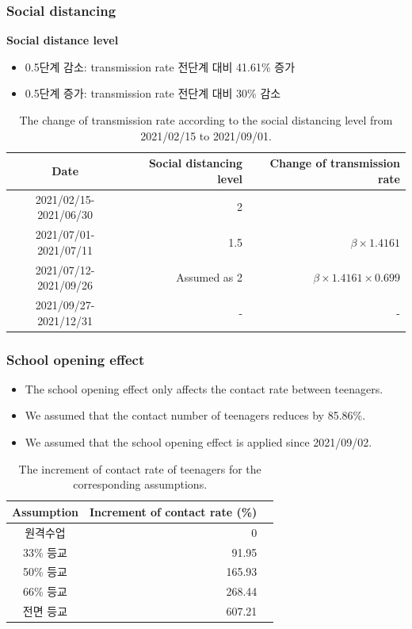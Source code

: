 \documentclass[aspectratio=169, 9pt, xcolor=dvipsnames]{beamer}
\begin{document}
	\begin{frame}\frametitle{Social distancing}
		\textbf{Social distance level}
		\begin{itemize}
			\item 0.5단계 감소: transmission rate 전단계 대비 41.61\% 증가
			\item 0.5단계 증가: transmission rate 전단계 대비 30\% 감소
		\end{itemize}
	    \begin{table}
	    	\begin{tabular}{crr}
	    		\toprule
	    		\textbf{Date} & \textbf{Social distancing level} & \textbf{Change of transmission rate} \\
	    		\midrule
	    		2021/02/15-2021/06/30 & 2 &  \\
	    		2021/07/01-2021/07/11 & 1.5 & $\beta \times 1.4161$ \\
	    		2021/07/12-2021/09/26 & Assumed as 2 & $\beta \times 1.4161 \times 0.699$ \\
	    		2021/09/27-2021/12/31\footnotemark[2] & - & - \\
	    		\bottomrule
	    	\end{tabular}
	    	\caption{The change of transmission rate according to the social distancing level from 2021/02/15 to 2021/09/01.}
	    \end{table}
	\end{frame}

	\begin{frame}\frametitle{School opening effect}
		\begin{itemize}
			\item The school opening effect only affects the contact rate between teenagers.
			\item We assumed that the contact number of teenagers reduces by 85.86\%.
			\item We assumed that the school opening effect is applied since 2021/09/02.
		\end{itemize}
	    \begin{table}
	    	\begin{tabular}{crr}
	    		\toprule
	    		\textbf{Assumption} & \textbf{Increment of contact rate (\%)} \\
	    		\midrule
	    		원격수업 & 0 \\
	    		33\% 등교 & 91.95 \\
	    		50\% 등교 & 165.93 \\
	    		66\% 등교 & 268.44 \\
	    		전면 등교 & 607.21 \\
	    		\bottomrule
	    	\end{tabular}
	    	\caption{The increment of contact rate of teenagers for the corresponding assumptions.}
	    \end{table}
	\end{frame}
\end{document}
